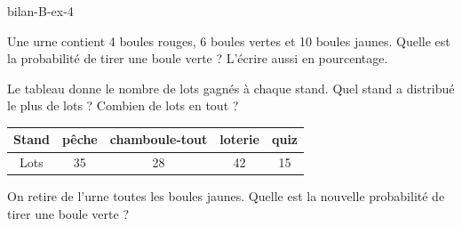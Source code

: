 \begin{blocEdition}{bilan-B-ex-4}
\begin{questions}
\item Une urne contient 4 boules rouges, 6 boules vertes et 10 boules jaunes. Quelle est la probabilité de tirer une boule verte ? L’écrire aussi en pourcentage.
\item Le tableau donne le nombre de lots gagnés à chaque stand. Quel stand a distribué le plus de lots ? Combien de lots en tout ?\begin{center}\renewcommand{\arraystretch}{1.35}\begin{tabular}{c|cccc}\toprule
Stand & pêche & chamboule-tout & loterie & quiz\\\midrule
Lots & 35 & 28 & 42 & 15\\
\bottomrule\end{tabular}\end{center}
\item On retire de l’urne toutes les boules jaunes. Quelle est la nouvelle probabilité de tirer une boule verte ?
\end{questions}\par{}\par\par{}\par{}\par{}\par{}\par{}\par{}
\end{blocEdition}
